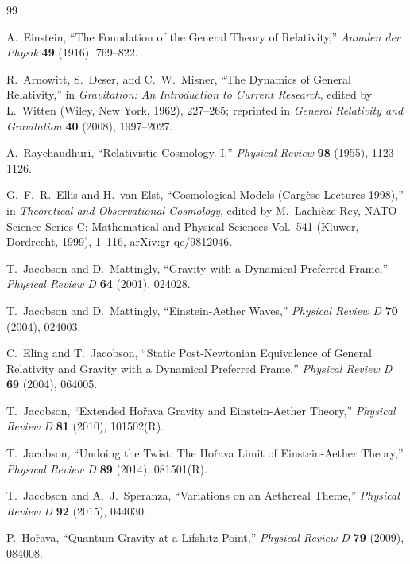 \begin{thebibliography}{99}

A.~Einstein,
``The Foundation of the General Theory of Relativity,''
\emph{Annalen der Physik} \textbf{49} (1916), 769--822.

R.~Arnowitt, S.~Deser, and C.~W.~Misner,
``The Dynamics of General Relativity,''
in \emph{Gravitation: An Introduction to Current Research},
edited by L.~Witten (Wiley, New York, 1962), 227--265;
reprinted in \emph{General Relativity and Gravitation} \textbf{40} (2008), 1997--2027.

A.~Raychaudhuri,
``Relativistic Cosmology. I,''
\emph{Physical Review} \textbf{98} (1955), 1123--1126.

G.~F.~R.~Ellis and H.~van Elst,
``Cosmological Models (Carg\`ese Lectures 1998),''
in \emph{Theoretical and Observational Cosmology},
edited by M.~Lachi\`eze-Rey,
NATO Science Series C: Mathematical and Physical Sciences Vol.~541
(Kluwer, Dordrecht, 1999), 1--116,
\href{https://arxiv.org/abs/gr-qc/9812046}{arXiv:gr-qc/9812046}.

T.~Jacobson and D.~Mattingly,
``Gravity with a Dynamical Preferred Frame,''
\emph{Physical Review D} \textbf{64} (2001), 024028.

T.~Jacobson and D.~Mattingly,
``Einstein-Aether Waves,''
\emph{Physical Review D} \textbf{70} (2004), 024003.

C.~Eling and T.~Jacobson,
``Static Post-Newtonian Equivalence of General Relativity and Gravity with a Dynamical Preferred Frame,''
\emph{Physical Review D} \textbf{69} (2004), 064005.

T.~Jacobson,
``Extended Ho\v{r}ava Gravity and Einstein-Aether Theory,''
\emph{Physical Review D} \textbf{81} (2010), 101502(R).

T.~Jacobson,
``Undoing the Twist: The Ho\v{r}ava Limit of Einstein-Aether Theory,''
\emph{Physical Review D} \textbf{89} (2014), 081501(R).

T.~Jacobson and A.~J.~Speranza,
``Variations on an Aethereal Theme,''
\emph{Physical Review D} \textbf{92} (2015), 044030.

P.~Ho\v{r}ava,
``Quantum Gravity at a Lifshitz Point,''
\emph{Physical Review D} \textbf{79} (2009), 084008.


\end{thebibliography}
